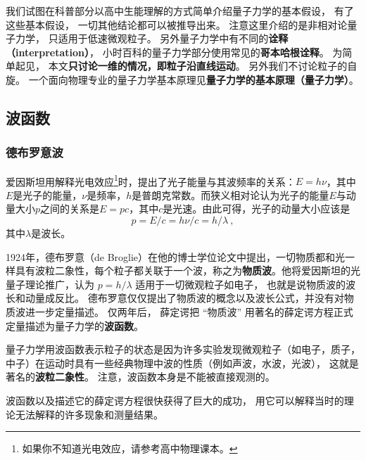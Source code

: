 

我们试图在科普部分以高中生能理解的方式简单介绍量子力学的基本假设， 有了这些基本假设， 一切其他结论都可以被推导出来。 注意这里介绍的是非相对论量子力学， 只适用于低速微观粒子。 另外量子力学中有不同的\textbf{诠释（interpretation）}， 小时百科的量子力学部分使用常见的\textbf{哥本哈根诠释}。 为简单起见， 本文\textbf{只讨论一维的情况，即粒子沿直线运动}。 另外我们不讨论粒子的自旋。 一个面向物理专业的量子力学基本原理见\textbf{量子力学的基本原理（量子力学）}。%

\subsection{波函数}

\subsubsection{德布罗意波}
爱因斯坦用解释光电效应\footnote{如果你不知道光电效应，请参考高中物理课本。%
}时，提出了光子能量与其波频率的关系：$E=h\nu$，其中$E$是光子的能量，$\nu$是频率，$h$是普朗克常数。而狭义相对论认为光子的能量$E$与动量大小$p$之间的关系是$E=pc$，其中$c$是光速。由此可得，光子的动量大小应该是
\begin{equation}
p=E/c=h\nu/c=h/\lambda~,
\end{equation}
其中$\lambda$是波长。

1924年，德布罗意（de Broglie）在他的博士学位论文中提出，一切物质都和光一样具有波粒二象性，每个粒子都关联于一个波，称之为\textbf{物质波}。他将爱因斯坦的光量子理论推广，认为 $p=h/\lambda$ 适用于一切微观粒子如电子， 也就是说物质波的波长和动量成反比。 德布罗意仅仅提出了物质波的概念以及波长公式，并没有对物质波进一步定量描述。 仅两年后， 薛定谔把 “物质波” 用著名的薛定谔方程正式定量描述为量子力学的\textbf{波函数}。

量子力学用波函数表示粒子的状态是因为许多实验发现微观粒子（如电子，质子，中子）在运动时具有一些经典物理中波的性质（例如声波，水波，光波）， 这就是著名的\textbf{波粒二象性}。 注意，波函数本身是不能被直接观测的。

波函数以及描述它的薛定谔方程很快获得了巨大的成功， 用它可以解释当时的理论无法解释的许多现象和测量结果。

